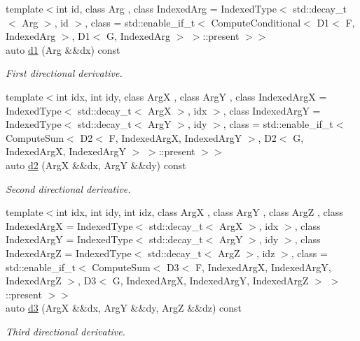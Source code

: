 \begin{DoxyCompactItemize}
{\footnotesize template$<$int id, class Arg , class Indexed\+Arg  = Indexed\+Type$<$ std\+::decay\+\_\+t$<$ Arg $>$, id $>$, class  = std\+::enable\+\_\+if\+\_\+t$<$                       Compute\+Conditional$<$ D1$<$ F, Indexed\+Arg $>$, D1$<$ G, Indexed\+Arg $>$ $>$\+::present $>$$>$ }\\auto \hyperlink{structFunG_1_1Max_aba38a9cd783b08818779a18b6fef07dd}{d1} (Arg \&\&dx) const 
\begin{DoxyCompactList}\small\item\em First directional derivative. \end{DoxyCompactList}\item 
{\footnotesize template$<$int idx, int idy, class ArgX , class ArgY , class Indexed\+ArgX  = Indexed\+Type$<$ std\+::decay\+\_\+t$<$ Arg\+X $>$, idx $>$, class Indexed\+ArgY  = Indexed\+Type$<$ std\+::decay\+\_\+t$<$ Arg\+Y $>$, idy $>$, class  = std\+::enable\+\_\+if\+\_\+t$<$ Compute\+Sum$<$ D2$<$ F, Indexed\+Arg\+X, Indexed\+Arg\+Y $>$,                                                  D2$<$ G, Indexed\+Arg\+X, Indexed\+Arg\+Y $>$ $>$\+::present $>$$>$ }\\auto \hyperlink{structFunG_1_1Max_a46739797766a13c81d6a61b7bb3d1ccd}{d2} (ArgX \&\&dx, ArgY \&\&dy) const 
\begin{DoxyCompactList}\small\item\em Second directional derivative. \end{DoxyCompactList}\item 
{\footnotesize template$<$int idx, int idy, int idz, class ArgX , class ArgY , class ArgZ , class Indexed\+ArgX  = Indexed\+Type$<$ std\+::decay\+\_\+t$<$ Arg\+X $>$, idx $>$, class Indexed\+ArgY  = Indexed\+Type$<$ std\+::decay\+\_\+t$<$ Arg\+Y $>$, idy $>$, class Indexed\+ArgZ  = Indexed\+Type$<$ std\+::decay\+\_\+t$<$ Arg\+Z $>$, idz $>$, class  = std\+::enable\+\_\+if\+\_\+t$<$                       Compute\+Sum$<$ D3$<$ F, Indexed\+Arg\+X, Indexed\+Arg\+Y, Indexed\+Arg\+Z $>$,                                   D3$<$ G, Indexed\+Arg\+X, Indexed\+Arg\+Y, Indexed\+Arg\+Z $>$ $>$\+::present $>$$>$ }\\auto \hyperlink{structFunG_1_1Max_aea2802909b5bc234fd6baafb0e7fdf16}{d3} (ArgX \&\&dx, ArgY \&\&dy, ArgZ \&\&dz) const 
\begin{DoxyCompactList}\small\item\em Third directional derivative. \end{DoxyCompactList}\end{DoxyCompactItemize}


